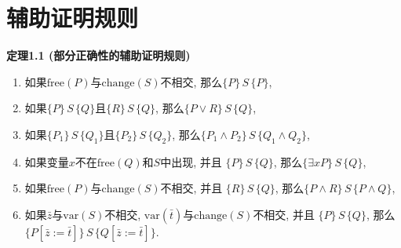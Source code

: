 \documentclass[UTF8]{ctexart}
\begin{document}
\setlength{\abovedisplayskip}{1pt}
\setlength{\belowdisplayskip}{1pt}

\section{辅助证明规则}

\hypertarget{sec:定理1.1}{}
\noindent\textbf{定理1.1 (部分正确性的辅助证明规则)}

\begin{enumerate}
    \item 如果$\mathrm{free}(P)$与$\mathrm{change}(S)$不相交,
    那么$\{P\}\,S\,\{P\}$,
    \item 如果$\{P\}\,S\,\{Q\}$且$\{R\}\,S\,\{Q\}$,
    那么$\{P\lor R\}\,S\,\{Q\}$,
    \item 如果$\{P_1\}\,S\,\{Q_1\}$且$\{P_2\}\,S\,\{Q_2\}$,
    那么$\{P_1\land P_2\}\,S\,\{Q_1\land Q_2\}$,
    \item 如果变量$x$不在$\mathrm{free}(Q)$和$S$中出现, 并且
    $\{P\}\,S\,\{Q\}$, 那么$\{\exists xP\}\,S\,\{Q\}$,
    \item 如果$\mathrm{free}(P)$与$\mathrm{change}(S)$不相交, 并且
    $\{R\}\,S\,\{Q\}$, 那么$\{P\land R\}\,S\,\{P\land Q\}$,
    \item 如果$\bar{z}$与$\mathrm{var}(S)$不相交,
    $\mathrm{var}(\bar{t})$与$\mathrm{change}(S)$不相交, 并且
    $\{P\}\,S\,\{Q\}$, 那么$\{P[\bar{z}:=\bar{t}]\}\,S\,\{Q[\bar{z}:=\bar{t}]\}$.
\end{enumerate}

\end{document}
